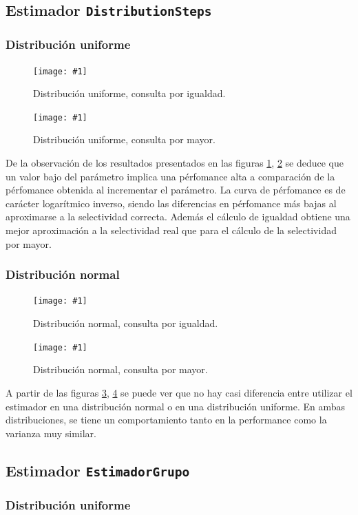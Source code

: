 \documentclass[a4paper, 10pt, twoside]{article}
\newcommand{\grafico}[3]{
  \begin{figure}[H]
    \texttt{[image: \#1]}
    \caption{#2}
    \label{#3}
  \end{figure}
}
\begin{document}
\subsection{Estimador \texttt{DistributionSteps}}


\subsubsection{Distribución uniforme}
\grafico{plot-diststep-uniform-equal}
        {Distribución uniforme, consulta por igualdad.}
        {plot-diststep-uniform-equal}
\grafico{plot-diststep-uniform-greater}
        {Distribución uniforme, consulta por mayor.}
        {plot-diststep-uniform-greater}
De la observación de los resultados presentados en las figuras \ref{plot-diststep-uniform-equal}, \ref{plot-diststep-uniform-greater} se deduce que un valor bajo del parámetro implica una pérfomance alta a comparación de la pérfomance obtenida al 
incrementar el parámetro. La curva de pérfomance es de carácter logarítmico inverso, siendo las diferencias en pérfomance más bajas
al aproximarse a la selectividad correcta.
Además el cálculo de igualdad obtiene una mejor aproximación a la selectividad real 
que para el cálculo de la selectividad por mayor.
\subsubsection{Distribución normal}    
\grafico{plot-diststep-normal-equal}
        {Distribución normal, consulta por igualdad.}
        {plot-diststep-normal-equal}
\grafico{plot-diststep-normal-greater}
        {Distribución normal, consulta por mayor.}
        {plot-diststep-normal-greater}

A partir de las figuras \ref{plot-diststep-normal-equal}, \ref{plot-diststep-normal-greater} se puede ver que no hay casi diferencia entre utilizar el estimador 
en una distribución normal o en una distribución uniforme. En ambas distribuciones, se tiene un comportamiento tanto en la performance como la varianza muy similar.

\subsection{Estimador \texttt{EstimadorGrupo}}

\subsubsection{Distribución uniforme}
\end{document}
